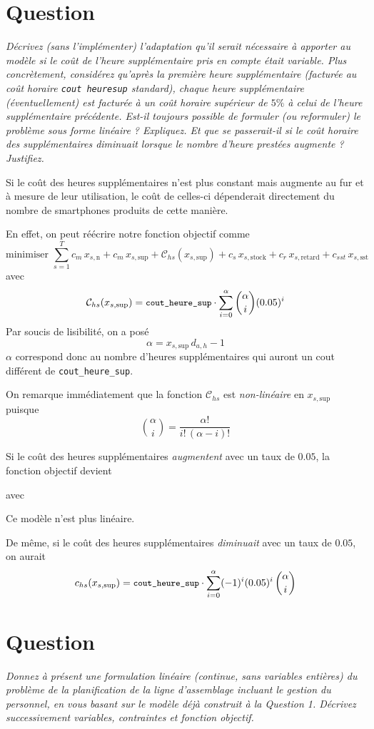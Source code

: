 \documentclass[12pt,oneside,a4paper]{article}
\newcommand{\question}
{
\addtocounter{section}{1}
\section*{Question \thesection}
}
\newcommand{\myX}[2]{x_{#1,\text{#2}}}
\newcommand{\xSemaine}[1]{\myX{s}{#1}}
\newcommand{\xn}{\xSemaine{n}}
\newcommand{\xsup}{\xSemaine{sup}}
\newcommand{\xstock}{\xSemaine{stock}}
\newcommand{\xretard}{\xSemaine{retard}}
\newcommand{\xsst}{\xSemaine{sst}}
\newcommand{\texttts}[1]{{\small\texttt{#1}}}
\begin{document}
\question %
\emph{Décrivez (sans l'implémenter) l'adaptation qu'il serait nécessaire à
apporter au modèle si le coût de l'heure supplémentaire pris en compte était
variable. Plus concrètement, considérez qu'après la première heure
supplémentaire (facturée au coût horaire \texttt{cout\textunderscore
heure\textunderscore sup} standard), chaque heure supplémentaire
(éventuellement) est facturée à un coût horaire supérieur de $5 \%$ 
à celui de l'heure supplémentaire précédente. 
Est-il toujours possible de formuler (ou reformuler) 
le problème sous forme linéaire ? Expliquez. 
Et que se passerait-il si le coût horaire des supplémentaires \emph{diminuait}
lorsque le nombre d'heure prestées augmente ? Justifiez.}

Si le coût des heures supplémentaires n'est plus constant mais augmente au fur et à mesure de leur utilisation, 
le coût de celles-ci dépenderait directement du nombre de smartphones 
produits de cette manière.

En effet, on peut réécrire notre fonction objectif comme
\[
  \mbox{minimiser } 
  \sum_{s=1}^{T} 
  c_m\, \xn + c_m \, \xsup + \mathcal{C}_{hs} (\xsup)
  + c_s\, \xstock + c_r\, \xretard + c_{sst}\, \xsst
\]
avec
\[
  \mathcal{C}_{hs} (\xsup) = \texttts{cout\_heure\_sup} \cdot
  \sum_{i=0}^{\alpha} \binom{\alpha}{i} (0.05)^{i} 
\]
Par soucis de lisibilité, on a posé
\[ \alpha = \xsup \, d_{a,h} - 1 \]
$\alpha$ correspond donc au nombre d'heures supplémentaires qui auront
un cout différent de \texttt{cout\_heure\_sup}.

On remarque immédiatement que la fonction $\mathcal{C}_{hs}$
est \emph{non-linéaire} en $\xsup$ puisque 
\[ \binom{\alpha}{i} =\frac{\alpha !}{i!\,(\alpha-i)!} \]

Si le coût des heures supplémentaires \emph{augmentent} avec un taux de $0.05$,
la fonction objectif devient 

avec

Ce modèle n'est plus linéaire.

De même, si le coût des heures supplémentaires \emph{diminuait} 
avec un taux de $0.05$,
on aurait
\[
  c_{hs} (\xsup) = \texttts{cout\_heure\_sup} \cdot
  \sum_{i=0}^{\alpha} (-1)^i(0.05)^{i} \,   \binom{\alpha}{i}
\]


\question %
\emph{Donnez à présent une formulation linéaire (continue, sans variables
entières) du problème de la planification de la ligne d'assemblage
incluant le gestion du personnel, en vous basant sur le modèle déjà 
construit à la Question 1. Décrivez successivement variables, 
contraintes et fonction objectif.}
\end{document}
